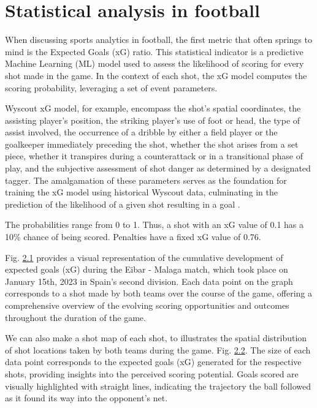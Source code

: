 \documentclass[twoside,nohyper]{tufte-book}
\begin{document}
\hypertarget{statistical-analysis-in-football-1}{%
\section{Statistical analysis in football}\label{statistical-analysis-in-football-1}}

When discussing sports analytics in football, the first metric that
often springs to mind is the Expected Goals (xG) ratio. This statistical
indicator is a predictive Machine Learning (ML) model used to assess the
likelihood of scoring for every shot made in the game. In the context of
each shot, the xG model computes the scoring probability, leveraging a
set of event parameters.

Wyscout xG model, for example, encompass the shot's spatial coordinates,
the assisting player's position, the striking player's use of foot or
head, the type of assist involved, the occurrence of a dribble by either
a field player or the goalkeeper immediately preceding the shot, whether
the shot arises from a set piece, whether it transpires during a
counterattack or in a transitional phase of play, and the subjective
assessment of shot danger as determined by a designated tagger. The
amalgamation of these parameters serves as the foundation for training
the xG model using historical Wyscout data, culminating in the
prediction of the likelihood of a given shot resulting in a goal
\citep{wyscout}.

The probabilities range from 0 to 1. Thus, a shot with an xG value of
0.1 has a 10\% chance of being scored. Penalties have a fixed xG value of
0.76.

Fig. \protect\hyperlink{f2.1}{2.1} provides a
visual representation of the cumulative development of expected goals
(xG) during the Eibar - Malaga match, which took place on January 15th,
2023 in Spain's second division. Each data point on the graph
corresponds to a shot made by both teams over the course of the game,
offering a comprehensive overview of the evolving scoring opportunities
and outcomes throughout the duration of the game.

We can also make a shot map of each shot, to illustrates the spatial
distribution of shot locations taken by both teams during the game. Fig.
\protect\hyperlink{f2.2}{2.2}. The size of each
data point corresponds to the expected goals (xG) generated for the
respective shots, providing insights into the perceived scoring
potential. Goals scored are visually highlighted with straight lines,
indicating the trajectory the ball followed as it found its way into the
opponent's net.
\end{document}
